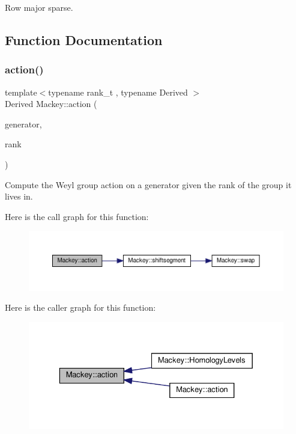 Row major sparse. 



\subsection{Function Documentation}
\mbox{\label{namespaceMackey_aa515b26c0fbc7f19b36cee7d826f07b9}} 
\subsubsection{\texorpdfstring{action()}{action()}\hspace{0.1cm}{\footnotesize\ttfamily [1/2]}}
{\footnotesize\ttfamily template$<$typename rank\+\_\+t , typename Derived $>$ \\
Derived Mackey\+::action (\begin{DoxyParamCaption}\item[{const Eigen\+::\+Matrix\+Base$<$ Derived $>$ \&}]{generator,  }\item[{const rank\+\_\+t \&}]{rank }\end{DoxyParamCaption})}



Compute the Weyl group action on a generator given the rank of the group it lives in. 

Here is the call graph for this function\+:\nopagebreak
\begin{figure}[H]
\begin{center}
\leavevmode
\includegraphics[width=350pt]{namespaceMackey_aa515b26c0fbc7f19b36cee7d826f07b9_cgraph}
\end{center}
\end{figure}
Here is the caller graph for this function\+:\nopagebreak
\begin{figure}[H]
\begin{center}
\leavevmode
\includegraphics[width=329pt]{namespaceMackey_aa515b26c0fbc7f19b36cee7d826f07b9_icgraph}
\end{center}
\end{figure}
\mbox{\label{namespaceMackey_aaa66c9857ba86a13949d1b1825ea20f7}} 
